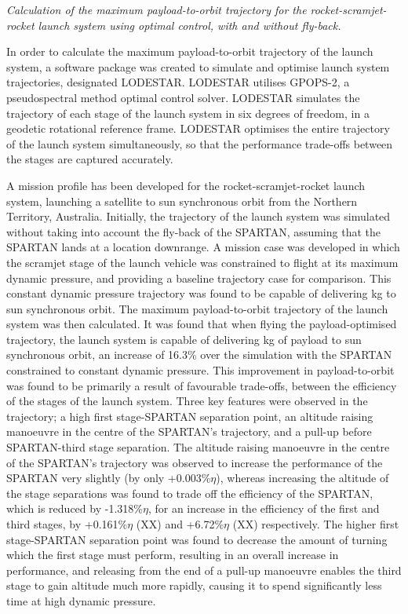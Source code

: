 	
\emph{Calculation of the maximum payload-to-orbit trajectory for the rocket-scramjet-rocket launch system using optimal control, with and without fly-back.}

In order to calculate the maximum payload-to-orbit trajectory of the launch system, a software package was created to simulate and optimise launch system trajectories, designated LODESTAR. LODESTAR utilises GPOPS-2, a pseudospectral method optimal control solver. LODESTAR simulates the trajectory of each stage of the launch system in six degrees of freedom, in a geodetic rotational reference frame. 
LODESTAR optimises the entire trajectory of the launch system simultaneously, so that the performance trade-offs between the stages are captured accurately.

A mission profile has been developed for the rocket-scramjet-rocket launch system, launching a satellite to sun synchronous orbit from the Northern Territory, Australia. 
Initially, the trajectory of the launch system was simulated without taking into account the fly-back of the SPARTAN, assuming that the SPARTAN lands at a location downrange.
A mission case was developed in which the scramjet stage of the launch vehicle was constrained to flight at its maximum dynamic pressure, and providing a baseline trajectory case for comparison. This constant dynamic pressure trajectory was found to be capable of delivering \PayloadToOrbitConstq kg to sun synchronous orbit. 
The maximum payload-to-orbit trajectory of the launch system was then calculated. It was found that when flying the payload-optimised trajectory, the launch system is capable of delivering \PayloadToOrbitStandardNoReturn kg of payload to sun synchronous orbit, an increase of 16.3\% over the simulation with the SPARTAN constrained to constant dynamic pressure. 
This improvement in payload-to-orbit was found to be primarily a result of favourable trade-offs, between the efficiency of the stages of the launch system.
Three key features were observed in the trajectory; a high first stage-SPARTAN separation point, an altitude raising manoeuvre in the centre of the SPARTAN's trajectory, and a pull-up before SPARTAN-third stage separation. 
The altitude raising manoeuvre in the centre of the SPARTAN's trajectory was observed to increase the performance of the SPARTAN very slightly (by only +0.003\%$\eta$), whereas increasing the altitude of the stage separations was found to trade off the efficiency of the SPARTAN, which is reduced by -1.318\%$\eta$, for an increase in the efficiency of the first and third stages, by +0.161\%$\eta$ (XX) and +6.72\%$\eta$ (XX) respectively.
The higher first stage-SPARTAN separation point was found to decrease the amount of turning which the first stage must perform, resulting in an overall increase in performance, and releasing from the end of a pull-up manoeuvre enables the third stage to gain altitude much more rapidly, causing it to spend significantly less time at high dynamic pressure. 
	
